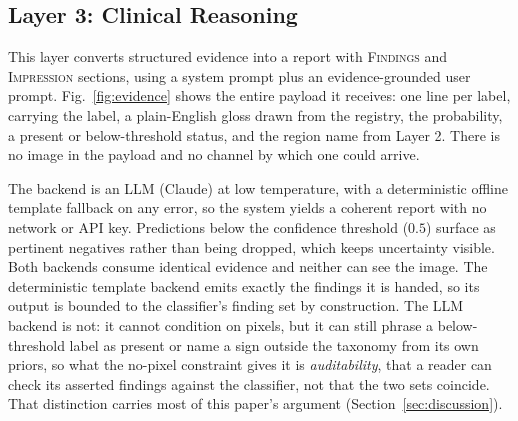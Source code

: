 \documentclass[conference]{IEEEtran}
\begin{document}
\subsection{Layer 3: Clinical Reasoning}
This layer converts structured evidence into a report with \textsc{Findings} and
\textsc{Impression} sections, using a system prompt plus an evidence-grounded user
prompt. Fig.~\ref{fig:evidence} shows the entire payload it receives: one line per
label, carrying the label, a plain-English gloss drawn from the registry, the
probability, a present or below-threshold status, and the region name from Layer 2.
There is no image in the payload and no channel by which one could arrive.

The backend is an LLM (Claude) at low temperature, with a deterministic offline
template fallback on any error, so the system yields a coherent report with no
network or API key. Predictions below the confidence threshold ($0.5$) surface as
pertinent negatives rather than being dropped, which keeps uncertainty visible.
Both backends consume identical evidence and neither can see the image. The
deterministic template backend emits exactly the findings it is handed, so its output
is bounded to the classifier's finding set by construction. The LLM backend is not:
it cannot condition on pixels, but it can still phrase a below-threshold label as
present or name a sign outside the taxonomy from its own priors, so what the no-pixel
constraint gives it is \emph{auditability}, that a reader can check its asserted
findings against the classifier, not that the two sets coincide. That distinction
carries most of this paper's argument (Section~\ref{sec:discussion}).
\end{document}

